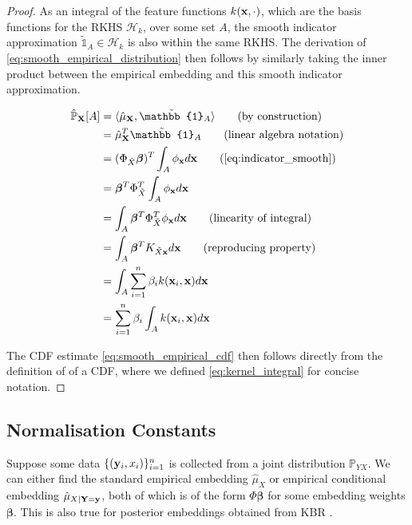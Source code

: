 \documentclass[twoside]{article} \usepackage{aistats2017}
\theoremstyle{definition}
\theoremstyle{theorem}
\newcommand{\rv}[1]{{#1}}
\newcommand{\ds}[1]{\tilde{#1}}
\newcommand{\inner}[2]{{\langle #1, #2 \rangle}}
\begin{document}
		\begin{proof}
			As an integral of the feature functions $k(\mathbf{x}, \cdot)$, which are the basis functions for the RKHS $\mathcal{H}_{k}$, over some set $A$, the smooth indicator approximation $\tilde{\mathbb{1}}_{A} \in \mathcal{H}_{k}$ is also within the same RKHS. The derivation of \eqref{eq:smooth_empirical_distribution} then follows by similarly taking the inner product between the empirical embedding and this smooth indicator approximation.
			
			\begin{align*}
					\hat{\mathbb{P}}_{\bvec{\rv{X}}}[A] &= \inner{\hat{\mu}_{\bvec{\rv{X}}}}{\tilde{\mathbb{1}}_{A}} \tag{by construction} \\
					&= \hat{\mu}_{\bvec{\rv{X}}}^{T} \tilde{\mathbb{1}}_{A} \tag{linear algebra notation} \\
					&= (\Phi_{\ds{X}} \bm{\beta})^{T} \int_{A} \phi_{\bvec{x}} d\bvec{x} \tag{\cref{eq:indicator_smooth}} \\
					&= \bm{\beta}^{T} \Phi_{\ds{X}}^{T} \int_{A} \phi_{\bvec{x}} d\bvec{x} \\
					&= \int_{A} \bm{\beta}^{T} \Phi_{\ds{X}}^{T} \phi_{\bvec{x}} d\bvec{x} \tag{linearity of integral} \\
					&= \int_{A} \bm{\beta}^{T} K_{\ds{X} \bvec{x}} d\bvec{x} \tag{reproducing property} \\
					&= \int_{A} \sum_{i = 1}^{n} \beta_{i} k(\bvec{x}_{i}, \bvec{x}) d\bvec{x} \\
					&= \sum_{i = 1}^{n} \beta_{i} \int_{A}  k(\bvec{x}_{i}, \bvec{x}) d\bvec{x} \\
			\end{align*}
			
			The CDF estimate \eqref{eq:smooth_empirical_cdf} then follows directly from the definition of of a CDF, where we defined \eqref{eq:kernel_integral} for concise notation.
		\end{proof}
		
	\subsection{Normalisation Constants}
	\label{sec:direct_quantile_regression:normalisation_constants}
	
		Suppose some data $\{(\mathbf{y}_{i}, x_{i})\}_{i = 1}^{n}$ is collected from a joint distribution $\mathbb{P}_{\rv{Y} \rv{X}}$. We can either find the standard empirical embedding $\hat{\mu}_{\rv{X}}$ or empirical conditional embedding $\hat{\mu}_{\rv{X} | \bvec{\rv{Y}} = \bvec{y}}$, both of which is of the form $\Phi \bm{\beta}$ for some embedding weights $\bm{\beta}$. This is also true for posterior embeddings obtained from KBR \citep{fukumizu2013kernel}.
		
\end{document}
